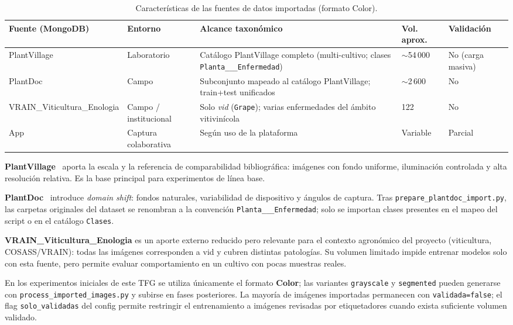 \documentclass[11pt,spanish,listoffigures,listoftables]{tfgetsinf}
\begin{document}
\begin{table}[htbp]
\centering
\caption{Características de las fuentes de datos importadas (formato Color).}
\label{tab:fuentes-produccion}
\begin{tabular}{@{}p{3.2cm}p{2.2cm}p{4.5cm}p{2cm}p{2.2cm}@{}}
\toprule
\textbf{Fuente (MongoDB)} & \textbf{Entorno} & \textbf{Alcance taxonómico} & \textbf{Vol. aprox.} & \textbf{Validación} \\
\midrule
PlantVillage & Laboratorio & Catálogo PlantVillage completo (multi-cultivo; clases \texttt{Planta\_\_\_Enfermedad}) & $\sim$54\,000 & No (carga masiva) \\
PlantDoc & Campo & Subconjunto mapeado al catálogo PlantVillage; train+test unificados & $\sim$2\,600 & No \\
VRAIN\_Viticultura\_Enologia & Campo / institucional & Solo \textit{vid} (\texttt{Grape}); varias enfermedades del ámbito vitivinícola & 122 & No \\
App & Captura colaborativa & Según uso de la plataforma & Variable & Parcial \\
\bottomrule
\end{tabular}
\end{table}

\textbf{PlantVillage}~\cite{mohanty2016} aporta la escala y la referencia de comparabilidad bibliográfica: imágenes con fondo uniforme, iluminación controlada y alta resolución relativa. Es la base principal para experimentos de línea base.

\textbf{PlantDoc}~\cite{plantdoc2020} introduce \textit{domain shift}: fondos naturales, variabilidad de dispositivo y ángulos de captura. Tras \texttt{prepare\_plantdoc\_import.py}, las carpetas originales del dataset se renombran a la convención \texttt{Planta\_\_\_Enfermedad}; solo se importan clases presentes en el mapeo del script o en el catálogo \texttt{Clases}.

\textbf{VRAIN\_Viticultura\_Enologia} es un aporte externo reducido pero relevante para el contexto agronómico del proyecto (viticultura, COSASS/VRAIN): todas las imágenes corresponden a vid y cubren distintas patologías. Su volumen limitado impide entrenar modelos solo con esta fuente, pero permite evaluar comportamiento en un cultivo con pocas muestras reales.

En los experimentos iniciales de este TFG se utiliza únicamente el formato \textbf{Color}; las variantes \texttt{grayscale} y \texttt{segmented} pueden generarse con \texttt{process\_imported\_images.py} y subirse en fases posteriores. La mayoría de imágenes importadas permanecen con \texttt{validada=false}; el flag \texttt{solo\_validadas} del config permite restringir el entrenamiento a imágenes revisadas por etiquetadores cuando exista suficiente volumen validado.
\end{document}
